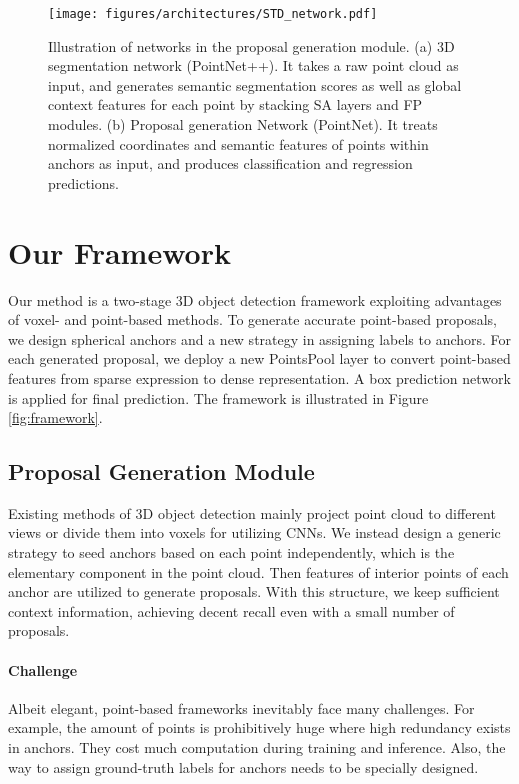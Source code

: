 \documentclass[10pt,twocolumn,letterpaper]{article}
\begin{document}
\begin{figure*}[bpt]
	\centering
	\texttt{[image: figures/architectures/STD\_network.pdf]}\\\vspace{-0.1in}
	\caption{Illustration of networks in the proposal generation module. (a) 3D segmentation network (PointNet++). It takes a raw point cloud  as input, and generates semantic segmentation scores as well as global context features for each point by stacking SA layers and FP modules. (b) Proposal generation Network (PointNet). It treats normalized coordinates and semantic features of points within anchors as input, and produces classification and regression predictions.}
	\label{fig:networks}
\end{figure*}

\section{Our Framework}

Our method is a two-stage 3D object detection framework exploiting advantages of voxel- and point-based methods. To generate accurate point-based proposals, we design spherical anchors and a new strategy in assigning labels to anchors. For each generated proposal, we deploy a new PointsPool layer to convert point-based features from sparse expression to dense representation. A box prediction network is applied for final prediction. The framework is illustrated in Figure \ref{fig:framework}.  

\subsection{Proposal Generation Module}

Existing methods of 3D object detection mainly project point cloud to different views or divide them into voxels for utilizing CNNs. We instead design a generic strategy to seed anchors based on each point independently, which is the elementary component in the point cloud. Then features of interior points of each anchor are utilized to generate proposals. With this structure, we keep sufficient context information, achieving decent recall even with a small number of proposals.

\vspace{-0.1in}
\paragraph{Challenge} Albeit elegant, point-based frameworks inevitably face many challenges. For example, the amount of points is prohibitively huge where high redundancy exists in anchors. They cost much computation during training and inference. Also, the way to assign ground-truth labels for anchors needs to be specially designed.
\end{document}
